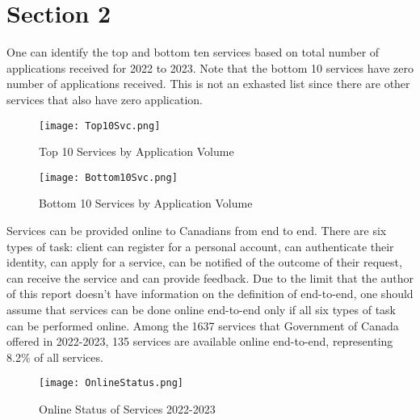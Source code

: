 \section{Section 2}

One can identify the top and bottom ten services based on total number of 
applications received for 2022 to 2023. Note that the bottom 10 services 
have zero number of applications received. This is not an exhasted list 
since there are other services that also have zero application. 

\begin{figure}
    \centering
    \texttt{[image: Top10Svc.png]}
    \caption{\label{fig:Top10}Top 10 Services by Application Volume}
\end{figure}

\begin{figure}
    \centering
    \texttt{[image: Bottom10Svc.png]}
    \caption{\label{fig:Bottom10}Bottom 10 Services by Application Volume}
\end{figure}

Services can be provided online to Canadians from end to end. There are 
six types of task: client can register for a personal account, can 
authenticate their identity, can apply for a service, can be notified of 
the outcome of their request, can receive the service and can provide 
feedback. Due to the limit that the author of this report doesn't have 
information on the definition of end-to-end, one should assume that 
services can be done online end-to-end only if all six types of task can 
be performed online. Among the 1637 services that Government of Canada 
offered in 2022-2023, 135 services are available online end-to-end, 
representing 8.2\% of all services.

\begin{figure}
    \centering
    \texttt{[image: OnlineStatus.png]}
    \caption{\label{fig:OnlStat}Online Status of Services 2022-2023}
\end{figure}
    